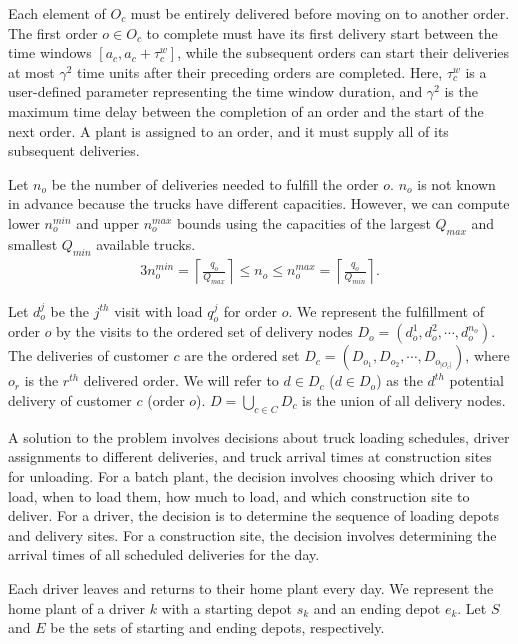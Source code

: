 \documentclass[authoryear,preprint,review,11pt]{elsarticle}
\begin{document}
Each element of $O_c$ must be entirely delivered before moving on to another order. The first order $o \in O_c$ to complete must have its first delivery start between the time windows $\left[a_c, a_c + \tau^w_c \right]$, while the subsequent orders can start their deliveries at most $\gamma^2$ time units after their preceding orders are completed. Here, $\tau^w_c$ is a user-defined parameter representing the time window duration, and $\gamma^2$ is the maximum time delay between the completion of an order and the start of the next order. A plant is assigned to an order, and it must supply all of its subsequent deliveries.

Let $n_o$ be the number of deliveries needed to fulfill the order $o$. $n_o$ is not known in advance because the trucks have different capacities. However, we can compute lower $n_o^{min}$ and upper $n_o^{max}$ bounds using the capacities of the largest $Q_{max}$ and smallest $Q_{min}$ available trucks.
\begin{alignat}{3}
    \label{mod:c0}
    n_o^{min} = \left\lceil \frac{q_o}{Q_{max}} \right\rceil \leq n_o \leq n_o^{max} = \left\lceil \frac{q_o}{Q_{min}} \right\rceil.
\end{alignat}

Let $d^j_{o}$ be the $j^{th}$ visit with load $q^j_{o}$ for order $o$. We represent the fulfillment of order $o$ by the visits to the ordered set of delivery nodes $D_o= \left(d^1_{o},d^2_{o},\cdots, d^{n_o}_{o}\right)$. The deliveries of customer $c$ are the ordered set $D_c= (D_{o_1}, D_{o_2},\cdots,D_{o_{|O_c|}})$, where $o_r$ is the $r^{th}$ delivered order. We will refer to $d \in D_c$ ($d \in D_o$) as the $d^{th}$ potential delivery of customer $c$ (order $o$). $D=\bigcup_{c\in C} D_c$ is the union of all delivery nodes.

A solution to the problem involves decisions about truck loading schedules, driver assignments to different deliveries, and truck arrival times at construction sites for unloading. For a batch plant, the decision involves choosing which driver to load, when to load them, how much to load, and which construction site to deliver. For a driver, the decision is to determine the sequence of loading depots and delivery sites. For a construction site, the decision involves determining the arrival times of all scheduled deliveries for the day.

Each driver leaves and returns to their home plant every day. We represent the home plant of a driver $k$ with a starting depot $s_k$ and an ending depot $e_k$. Let $S$ and $E$ be the sets of starting and ending depots, respectively.
\end{document}
